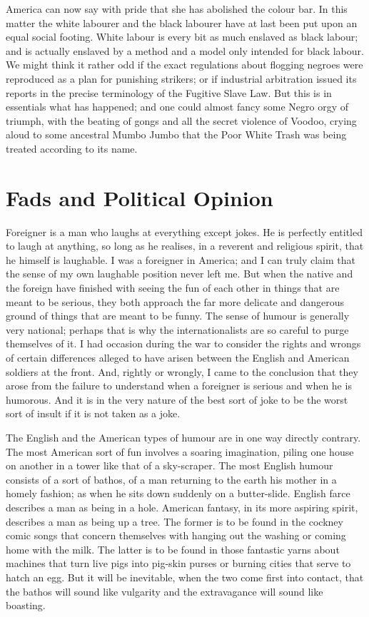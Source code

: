 \documentclass{book}
\begin{document}
America can now say with pride that she has abolished the colour bar. In this matter the white labourer and the black labourer have at last been put upon an equal social footing. White labour is every bit as much enslaved as black labour; and is actually enslaved by a method and a model only intended for black labour. We might think it rather odd if the exact regulations about flogging negroes were reproduced as a plan for punishing strikers; or if industrial arbitration issued its reports in the precise terminology of the Fugitive Slave Law. But this is in essentials what has happened; and one could almost fancy some Negro orgy of triumph, with the beating of gongs and all the secret violence of Voodoo, crying aloud to some ancestral Mumbo Jumbo that the Poor White Trash was being treated according to its name.

\chapter{Fads and Political Opinion}
\label{chapter-9}
Foreigner is a man who laughs at everything except jokes. He is perfectly entitled to laugh at anything, so long as he realises, in a reverent and religious spirit, that he himself is laughable. I was a foreigner in America; and I can truly claim that the sense of my own laughable position never left me. But when the native and the foreign have finished with seeing the fun of each other in things that are meant to be serious, they both approach the far more delicate and dangerous ground of things that are meant to be funny. The sense of humour is generally very national; perhaps that is why the internationalists are so careful to purge themselves of it. I had occasion during the war to consider the rights and wrongs of certain differences alleged to have arisen between the English and American soldiers at the front. And, rightly or wrongly, I came to the conclusion that they arose from the failure to understand when a foreigner is serious and when he is humorous. And it is in the very nature of the best sort of joke to be the worst sort of insult if it is not taken as a joke.

The English and the American types of humour are in one way directly contrary. The most American sort of fun involves a soaring imagination, piling one house on another in a tower like that of a sky-scraper. The most English humour consists of a sort of bathos, of a man returning to the earth his mother in a homely fashion; as when he sits down suddenly on a butter-slide. English farce describes a man as being in a hole. American fantasy, in its more aspiring spirit, describes a man as being up a tree. The former is to be found in the cockney comic songs that concern themselves with hanging out the washing or coming home with the milk. The latter is to be found in those fantastic yarns about machines that turn live pigs into pig-skin purses or burning cities that serve to hatch an egg. But it will be inevitable, when the two come first into contact, that the bathos will sound like vulgarity and the extravagance will sound like boasting.
\end{document}
